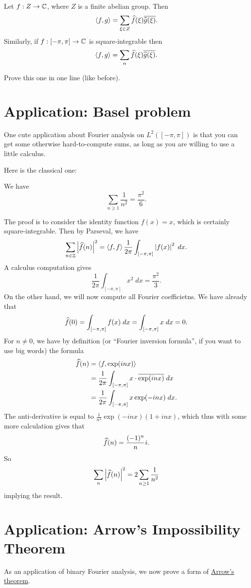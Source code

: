 \begin{corollary}
	Let $f : Z \to \mathbb C$, where $Z$ is a finite abelian group.
	Then \[ \left< f,g \right> = \sum_{\xi \in Z} \widehat f(\xi) \overline{\widehat g(\xi)}. \]
	Similarly, if $f : [-\pi, \pi] \to \mathbb C$ is square-integrable then
	\[ \left< f,g \right> = \sum_n \widehat f(\xi) \overline{\widehat g(\xi)}. \]
\end{corollary}
\begin{ques}
	Prove this one in one line (like before).
\end{ques}

\section{Application: Basel problem}
One cute application about Fourier analysis on $L^2([-\pi, \pi])$
is that you can get some otherwise hard-to-compute sums,
as long as you are willing to use a little calculus.

Here is the classical one:
\begin{theorem}
	We have
	\[ \sum_{n \ge 1} \frac{1}{n^2} = \frac{\pi^2}{6}. \]
\end{theorem}
The proof is to consider the identity function $f(x) = x$,
which is certainly square-integrable.
Then by Parseval, we have
\[
	\sum_{n \in \mathbb Z} \left\lvert \widehat f(n) \right\rvert^2
	= \left< f,f\right>
	\frac{1}{2\pi} \int_{[-\pi, \pi]} \left\lvert f(x) \right\rvert^2 \; dx.
\]
A calculus computation gives
\[  \frac{1}{2\pi} \int_{[-\pi, \pi]} x^2 \; dx = \frac{\pi^2}{3}. \]
On the other hand, we will now compute all Fourier coefficietns.
We have already that
\[ \widehat f(0) = \int_{[-\pi, \pi]} f(x) \; dx 
	= \int_{[-\pi, \pi]} x \; dx = 0. \]
For $n \neq 0$, we have by definition
(or ``Fourier inversion formula'', if you want to use big words)
the formula
\begin{align*}
	\widehat f(n) &= \left< f, \exp(inx) \right> \\
	&= \frac{1}{2\pi} \int_{[-\pi, \pi]} x \cdot \overline{\exp(inx)} \; dx \\
	&= \frac{1}{2\pi} \int_{[-\pi, \pi]} x \exp(-inx) \; dx.
\end{align*}
The anti-derivative is equal to
$\frac{1}{n^2} \exp(-inx) (1+inx)$,
which thus with some more calculation gives that
\[ \widehat f(n) = \frac{(-1)^n}{n} i. \]
So
\[ \sum_n \left\lvert \widehat f(n) \right\rvert^2
	= 2 \sum_{n \ge 1} \frac{1}{n^2} \]
implying the result.

\section{Application: Arrow's Impossibility Theorem}
As an application of binary Fourier analysis,
we now prove a form of
\href{https://en.wikipedia.org/wiki/Arrow's_impossibility_theorem}{Arrow's theorem}.

